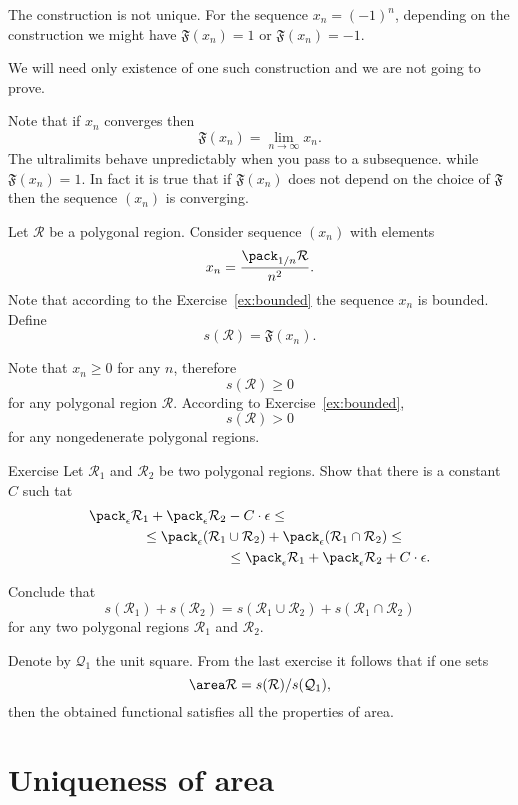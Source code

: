 The construction is not unique. 
For the sequence $x_n=(-1)^n$,
depending on the construction we might have $\mathfrak{F}(x_n)=1$ or $\mathfrak{F}(x_n)=-1$.

We will need only existence of one such construction
and we are not going to prove. %

Note that if $x_n$ converges then
$$\mathfrak{F}(x_n)=\lim_{n\to\infty} x_n.$$
The ultralimits behave unpredictably when you pass to a subsequence.
 while
$\mathfrak{F}(x_n)=1$.
In fact it is true that if $\mathfrak{F}(x_n)$ does not depend on the choice of  $\mathfrak{F}$ then the sequence $(x_n)$ is converging.

Let $\mathcal R$ be a polygonal region.
Consider sequence $(x_n)$ with elements
$$x_n=\frac{\pack_{1/n} \mathcal R}{n^2}.$$
Note that according to the Exercise~\ref{ex:bounded} the sequence $x_n$ is bounded.
Define 
$$s(\mathcal R)=\mathfrak{F}(x_n).$$

Note that $x_n\ge 0$ for any $n$, therefore 
$$s(\mathcal R)\ge 0$$
for any polygonal region $\mathcal R$.
According to Exercise~\ref{ex:bounded},
$$s(\mathcal R)> 0$$
for any nongedenerate polygonal regions.


\begin{thm}{Exercise}
Let $\mathcal R_1$ and $\mathcal R_2$ be  two polygonal regions.
Show that there is a constant $C$ such tat
\begin{align*}
\pack_\epsilon \mathcal R_1 +\pack_\epsilon\mathcal R_2 &-C\cdot\epsilon\le
\\
\le
\pack_\epsilon (\mathcal R_1&\cup\mathcal R_2) +\pack_\epsilon (\mathcal R_1\cap\mathcal R_2)
\le 
\\
&\le
\pack_\epsilon \mathcal R_1 +\pack_\epsilon\mathcal R_2 +C\cdot\epsilon.
\end{align*}

Conclude that 
$$s(\mathcal{R}_1)+s (\mathcal{R}_2)=s(\mathcal{R}_1\cup\mathcal{R}_2)+s(\mathcal{R}_1\cap\mathcal{R}_2)$$
for any two polygonal regions $\mathcal R_1$ and $\mathcal R_2$.
\end{thm}

Denote by $\mathcal{Q}_1$ the unit square.
From the last exercise it follows that if one sets
$$\area\mathcal{R}=s(\mathcal{R})/s(\mathcal{Q}_1),$$
then the obtained functional satisfies all the properties of area.

\section*{Uniqueness of area}

